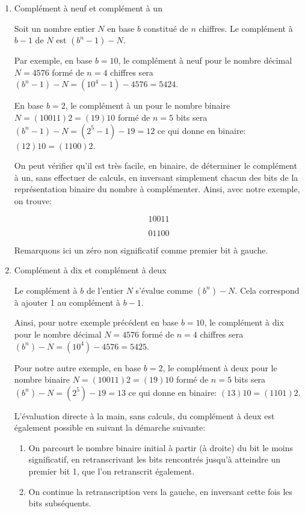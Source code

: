 \documentclass[letter, oneside]{book}
\begin{document}
\begin{enumerate}
\item Complément à neuf et complément à un
\label{sec:orgca0e71b}

Soit un nombre entier \(N\) en base \(b\) constitué de \(n\) chiffres. Le
complément à \(b-1\) de \(N\) est \((b^n-1)-N\).

Par exemple, en base \(b=10\), le complément à neuf pour le nombre décimal
\(N = 4576\) formé de \(n=4\) chiffres sera \((b^n-1)-N = (10^4 -1) -
4576 = 5424\).

En base \(b=2\), le complément à un pour le nombre binaire \(N =
(10011)2 = (19)10\) formé de \(n=5\) bits sera \((b^n-1)-N = (2^5
-1) - 19 = 12\) ce qui donne en binaire: \((12)10 = (1100)2\).

On peut vérifier qu'il est très facile, en binaire, de déterminer le
complément à un, sans effectuer de calculs, en inversant simplement
chacun des bits de la représentation binaire du nombre à
complémenter. Ainsi, avec notre exemple, on trouve:

$$ 10011 $$

$$ 01100 $$

Remarquons ici un zéro non significatif comme premier bit à gauche.

\item Complément à dix et complément à deux
\label{sec:orgf8a4ebf}

Le complément à \(b\) de l'entier \(N\) s'évalue comme
\((b^n)-N\). Cela correspond à ajouter 1 au complément à \(b-1\).

Ainsi, pour notre exemple précédent en base \(b=10\), le complément à
dix pour le nombre décimal \(N = 4576\) formé de \(n=4\) chiffres sera
\((b^n)-N = (10^4) - 4576 = 5425\).

Pour notre autre exemple, en base \(b=2\), le complément à deux pour
le nombre binaire \(N = (10011)2 = (19)10\) formé de \(n=5\) bits
sera \((b^n)-N = (2^5) - 19 = 13\) ce qui donne en binaire:
\((13)10 = (1101)2\).

L'évaluation directe à la main, sans calculs, du complément à deux est
également possible en suivant la démarche suivante:
\begin{enumerate}
\item On parcourt le nombre binaire initial à partir (à droite) du bit le moins
significatif, en retranscrivant les bits rencontrés jusqu'à
atteindre un premier bit 1, que l'on retranscrit également.
\item On continue la retranscription vers la gauche, en inversant cette
fois les bits subséquents.
\end{enumerate}


\end{enumerate}
\end{document}
